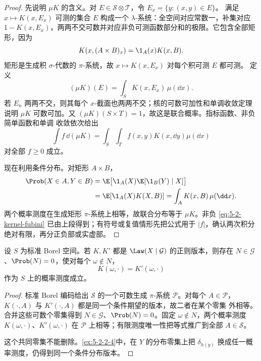 \begin{proof}
先说明 $\mu K$ 的含义。对 $E\in\mathcal S\otimes\mathcal T$，令 $E_x=\{y:(x,y)\in E\}$。
满足 $x\mapsto K(x,E_x)$ 可测的集合 $E$ 构成一个 $\lambda$-系统：全空间对应常数一，补集对应
$1-K(x,E_x)$，两两不交可数并对应非负可测函数部分和的极限。它包含全部矩形，因为
\[
 K(x,(A\times B)_x)=\1_A(x)K(x,B).
\]
矩形是生成积 $\sigma$-代数的 $\pi$-系统，故 $x\mapsto K(x,E_x)$ 对每个积可测 $E$ 都可测。
定义
\[
 (\mu K)(E)=\int_SK(x,E_x)\,\mu(\dd x).
\]
若 $E_n$ 两两不交，则其每个 $x$-截面也两两不交；核的可数可加性和单调收敛定理说明
$\mu K$ 可数可加。又 $(\mu K)(S\times T)=1$，故这是联合概率。指标函数、非负简单函数和单调
收敛依次给出
\[
 \int f\,\dd(\mu K)=\int_S\int_Tf(x,y)K(x,\dd y)\mu(\dd x)
\]
对全部 $f\geq0$ 成立。

现在利用条件分布。对矩形 $A\times B$，
\[
 \begin{aligned}
 \Prob(X\in A,Y\in B)
 &=\E\bigl[\1_A(X)\E[\1_B(Y)\mid X]\bigr]\\
 &=\E[\1_A(X)K(X,B)]
 =\int_AK(x,B)\,\mu(\dd x).
 \end{aligned}
\]
两个概率测度在生成矩形 $\pi$-系统上相等，故联合分布等于 $\mu K$。非负
\eqref{eq:5-2-kernel-fubini} 已由上段得到；有符号或复值情形先把公式用于 $|f|$，确认两次积分
绝对有限，再分正负部或实虚部。
\end{proof}

\begin{proposition}[核版本的共同零集唯一性]\label{proposition:5-2-2-5}
设 $S$ 为标准 Borel 空间。若 $K,K'$ 都是 $\Law(X\mid\mathcal G)$ 的正则版本，则存在
$N\in\mathcal G$、$\Prob(N)=0$，使对每个 $\omega\notin N$，
\[
 K(\omega,\cdot)=K'(\omega,\cdot)
\]
作为 $S$ 上的概率测度成立。
\end{proposition}

\begin{proof}
标准 Borel 编码给出 $\mathcal S$ 的一个可数生成 $\pi$-系统 $\mathcal P$。对每个
$A\in\mathcal P$，$K(\cdot,A)$ 与 $K'(\cdot,A)$ 都是同一个条件期望的版本，故二者在某个零集
外相等。合并这些可数个零集得到 $N\in\mathcal G$、$\Prob(N)=0$。固定
$\omega\notin N$，两个概率测度 $K(\omega,\cdot)$、$K'(\omega,\cdot)$ 在
$\mathcal P$ 上相等；有限测度唯一性把等式推广到全部 $A\in\mathcal S$。

这个共同零集不能删除。\cref{ex:5-2-2-4}中，在 $Y$ 的分布零集上把
$\delta_{h(y)}$ 换成任一概率测度，仍得到同一个条件分布版本。
\end{proof}

